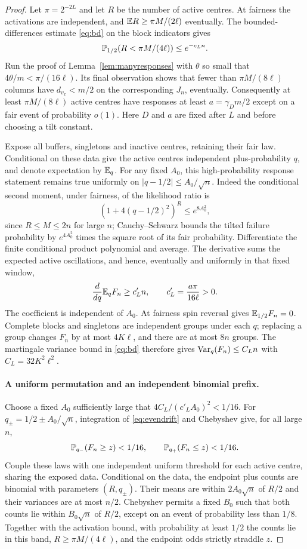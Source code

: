 \begin{proof}
Let $\pi=2^{-2L}$ and let $R$ be the number of active centres. At fairness the activations are independent, and $\mathbb E R\ge\pi M/(2\ell)$ eventually. The bounded-differences estimate \eqref{eq:bd} on the block indicators gives
\[
 \mathbb P_{1/2}(R<\pi M/(4\ell))\le e^{-c_L n}.
\]
Run the proof of Lemma~\ref{lem:manyresponses} with $\theta$ so small that $4\theta/m<\pi/(16\ell)$. Its final observation shows that fewer than $\pi M/(8\ell)$ columns have $d_{v_x}<m/2$ on the corresponding $J_n$, eventually. Consequently at least $\pi M/(8\ell)$ active centres have responses at least $a=\gamma_Dm/2$ except on a fair event of probability $o(1)$. Here $D$ and $a$ are fixed after $L$ and before choosing a tilt constant.

Expose all buffers, singletons and inactive centres, retaining their fair law. Conditional on these data give the active centres independent plus-probability $q$, and denote expectation by $\mathbb E_q$. For any fixed $A_0$, this high-probability response statement remains true uniformly on $|q-1/2|\le A_0/\sqrt n$. Indeed the conditional second moment, under fairness, of the likelihood ratio is
\[
 (1+4(q-1/2)^2)^R\le e^{8A_0^2},
\]
since $R\le M\le2n$ for large $n$; Cauchy--Schwarz bounds the tilted failure probability by $e^{4A_0^2}$ times the square root of its fair probability. Differentiate the finite conditional product polynomial and average. The derivative sums the expected active oscillations, and hence, eventually and uniformly in that fixed window,
\begin{equation}\label{eq:evendrift}
 \frac d{dq}\mathbb E_qF_n\ge c'_L n,\qquad
 c'_L=\frac{a\pi}{16\ell}>0.
\end{equation}
The coefficient is independent of $A_0$. At fairness spin reversal gives $\mathbb E_{1/2}F_n=0$. Complete blocks and singletons are independent groups under each $q$; replacing a group changes $F_n$ by at most $4K\ell$, and there are at most $8n$ groups. The martingale variance bound in \eqref{eq:bd} therefore gives $\operatorname{Var}_q(F_n)\le C_Ln$ with $C_L=32K^2\ell^2$.

\paragraph{A uniform permutation and an independent binomial prefix.}
Choose a fixed $A_0$ sufficiently large that $4C_L/(c'_LA_0)^2<1/16$. For $q_\pm=1/2\pm A_0/\sqrt n$, integration of \eqref{eq:evendrift} and Chebyshev give, for all large $n$,
\[
 \mathbb P_{q_-}(F_n\ge z)<1/16,\qquad
 \mathbb P_{q_+}(F_n\le z)<1/16.
\]
Couple these laws with one independent uniform threshold for each active centre, sharing the exposed data. Conditional on the data, the endpoint plus counts are binomial with parameters $(R,q_\pm)$. Their means are within $2A_0\sqrt n$ of $R/2$ and their variances are at most $n/2$. Chebyshev permits a fixed $B_0$ such that both counts lie within $B_0\sqrt n$ of $R/2$, except on an event of probability less than $1/8$. Together with the activation bound, with probability at least $1/2$ the counts lie in this band, $R\ge\pi M/(4\ell)$, and the endpoint odds strictly straddle $z$.


\end{proof}
